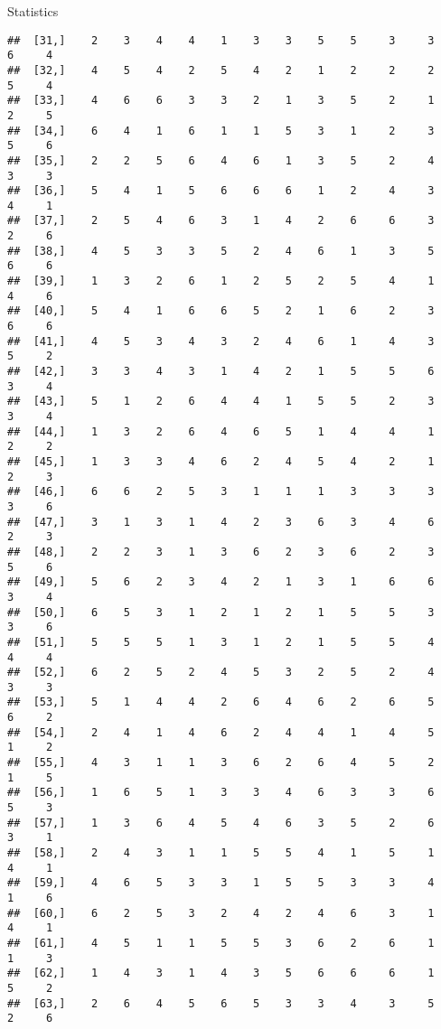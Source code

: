 \documentclass[
  ignorenonframetext,
]{beamer}
\begin{document}
\begin{frame}[fragile]{Statistics}
\begin{verbatim}
##  [31,]    2    3    4    4    1    3    3    5    5     3     3     6     4
##  [32,]    4    5    4    2    5    4    2    1    2     2     2     5     4
##  [33,]    4    6    6    3    3    2    1    3    5     2     1     2     5
##  [34,]    6    4    1    6    1    1    5    3    1     2     3     5     6
##  [35,]    2    2    5    6    4    6    1    3    5     2     4     3     3
##  [36,]    5    4    1    5    6    6    6    1    2     4     3     4     1
##  [37,]    2    5    4    6    3    1    4    2    6     6     3     2     6
##  [38,]    4    5    3    3    5    2    4    6    1     3     5     6     6
##  [39,]    1    3    2    6    1    2    5    2    5     4     1     4     6
##  [40,]    5    4    1    6    6    5    2    1    6     2     3     6     6
##  [41,]    4    5    3    4    3    2    4    6    1     4     3     5     2
##  [42,]    3    3    4    3    1    4    2    1    5     5     6     3     4
##  [43,]    5    1    2    6    4    4    1    5    5     2     3     3     4
##  [44,]    1    3    2    6    4    6    5    1    4     4     1     2     2
##  [45,]    1    3    3    4    6    2    4    5    4     2     1     2     3
##  [46,]    6    6    2    5    3    1    1    1    3     3     3     3     6
##  [47,]    3    1    3    1    4    2    3    6    3     4     6     2     3
##  [48,]    2    2    3    1    3    6    2    3    6     2     3     5     6
##  [49,]    5    6    2    3    4    2    1    3    1     6     6     3     4
##  [50,]    6    5    3    1    2    1    2    1    5     5     3     3     6
##  [51,]    5    5    5    1    3    1    2    1    5     5     4     4     4
##  [52,]    6    2    5    2    4    5    3    2    5     2     4     3     3
##  [53,]    5    1    4    4    2    6    4    6    2     6     5     6     2
##  [54,]    2    4    1    4    6    2    4    4    1     4     5     1     2
##  [55,]    4    3    1    1    3    6    2    6    4     5     2     1     5
##  [56,]    1    6    5    1    3    3    4    6    3     3     6     5     3
##  [57,]    1    3    6    4    5    4    6    3    5     2     6     3     1
##  [58,]    2    4    3    1    1    5    5    4    1     5     1     4     1
##  [59,]    4    6    5    3    3    1    5    5    3     3     4     1     6
##  [60,]    6    2    5    3    2    4    2    4    6     3     1     4     1
##  [61,]    4    5    1    1    5    5    3    6    2     6     1     1     3
##  [62,]    1    4    3    1    4    3    5    6    6     6     1     5     2
##  [63,]    2    6    4    5    6    5    3    3    4     3     5     2     6

\end{verbatim}
\end{frame}
\end{document}
